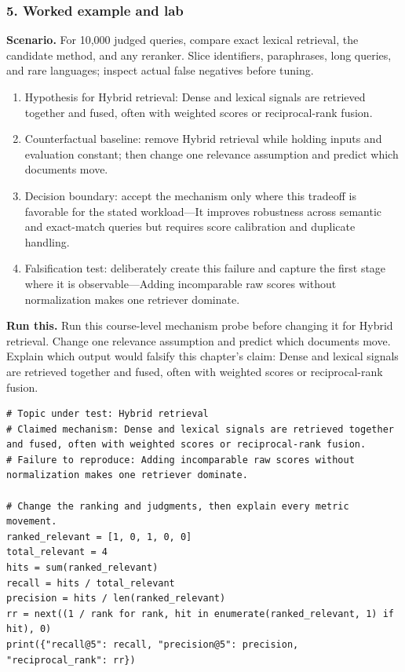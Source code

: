 \subsubsection*{5. Worked example and lab}
\textbf{Scenario.} For 10,000 judged queries, compare exact lexical retrieval, the candidate method, and any reranker. Slice identifiers, paraphrases, long queries, and rare languages; inspect actual false negatives before tuning.
\begin{enumerate}
\item Hypothesis for Hybrid retrieval: Dense and lexical signals are retrieved together and fused, often with weighted scores or reciprocal-rank fusion.
\item Counterfactual baseline: remove Hybrid retrieval while holding inputs and evaluation constant; then change one relevance assumption and predict which documents move.
\item Decision boundary: accept the mechanism only where this tradeoff is favorable for the stated workload—It improves robustness across semantic and exact-match queries but requires score calibration and duplicate handling.
\item Falsification test: deliberately create this failure and capture the first stage where it is observable—Adding incomparable raw scores without normalization makes one retriever dominate.
\end{enumerate}
\textbf{Run this.} Run this course-level mechanism probe before changing it for Hybrid retrieval. Change one relevance assumption and predict which documents move. Explain which output would falsify this chapter's claim: Dense and lexical signals are retrieved together and fused, often with weighted scores or reciprocal-rank fusion.
\begin{Verbatim}[fontsize=\scriptsize]
# Topic under test: Hybrid retrieval
# Claimed mechanism: Dense and lexical signals are retrieved together and fused, often with weighted scores or reciprocal-rank fusion.
# Failure to reproduce: Adding incomparable raw scores without normalization makes one retriever dominate.

# Change the ranking and judgments, then explain every metric movement.
ranked_relevant = [1, 0, 1, 0, 0]
total_relevant = 4
hits = sum(ranked_relevant)
recall = hits / total_relevant
precision = hits / len(ranked_relevant)
rr = next((1 / rank for rank, hit in enumerate(ranked_relevant, 1) if hit), 0)
print({"recall@5": recall, "precision@5": precision, "reciprocal_rank": rr})
\end{Verbatim}
